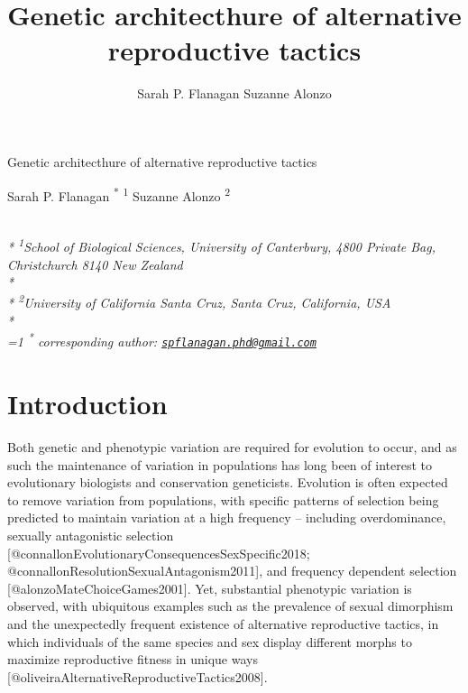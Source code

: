 \documentclass[11pt,]{article}
\title{Genetic architecthure of alternative reproductive tactics}
\author{
Sarah P. Flanagan
Suzanne Alonzo
}
\date{}
\begin{document}
\begin{singlespace}
\begin{center}
\huge Genetic architecthure of alternative reproductive tactics
\end{center}
\begin{center}
\large
Sarah P. Flanagan \textsuperscript{*} \textsuperscript{1} 
Suzanne Alonzo \textsuperscript{2} 
\end{center}
\begin{justify}
\footnotesize \emph{ 
\\*
\textsuperscript{1}School of Biological Sciences, University of Canterbury, 4800 Private Bag, Christchurch 8140 New Zealand\\*
\\*
\textsuperscript{2}University of California Santa Cruz, Santa Cruz, California, USA\\*
}
\setcounter{num}{1}
\\[0.1cm]
\footnotesize \emph{ 
\ifnum\value{num}=1%
\textsuperscript{*} corresponding author:
\fi
\href{mailto:spflanagan.phd@gmail.com}{\nolinkurl{spflanagan.phd@gmail.com}}
}
\end{justify}
\normalsize

\end{singlespace}

{
\hypersetup{linkcolor=black}
\setcounter{tocdepth}{2}
\tableofcontents
}

\hypertarget{introduction}{%
\section{Introduction}\label{introduction}}

Both genetic and phenotypic variation are required for evolution to occur, and as such the maintenance of variation in populations has long been of interest to evolutionary biologists and conservation geneticists. Evolution is often expected to remove variation from populations, with specific patterns of selection being predicted to maintain variation at a high frequency -- including overdominance, sexually antagonistic selection {[}@connallonEvolutionaryConsequencesSexSpecific2018; @connallonResolutionSexualAntagonism2011{]}, and frequency dependent selection {[}@alonzoMateChoiceGames2001{]}. Yet, substantial phenotypic variation is observed, with ubiquitous examples such as the prevalence of sexual dimorphism and the unexpectedly frequent existence of alternative reproductive tactics, in which individuals of the same species and sex display different morphs to maximize reproductive fitness in unique ways {[}@oliveiraAlternativeReproductiveTactics2008{]}.
\end{document}
